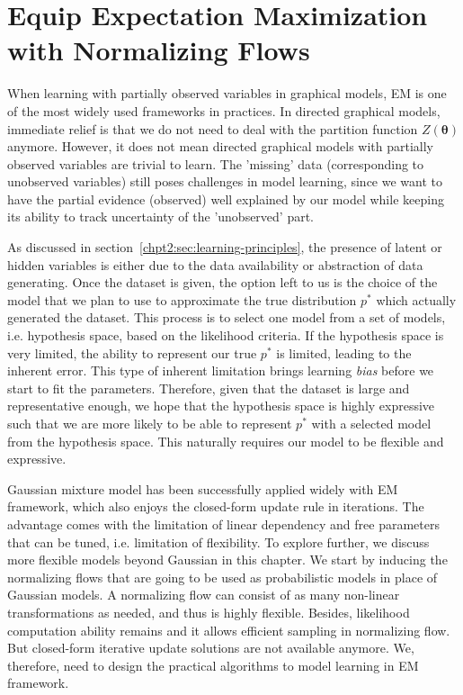 \chapter{Equip Expectation Maximization with Normalizing Flows}
\label{chpt6:em-flow}
\graphicspath{{source/chapter6/}}

When learning with partially observed variables in graphical models, EM is one of the most widely used frameworks in practices. In directed graphical models, immediate relief is that we do not need to deal with the partition function $Z(\bm{\theta})$ anymore. However, it does not mean directed graphical models with partially observed variables are trivial to learn. The 'missing' data (corresponding to unobserved variables) still poses challenges in model learning, since we want to have the partial evidence (observed) well explained by our model while keeping its ability to track uncertainty of the 'unobserved' part.

As discussed in section~\ref{chpt2:sec:learning-principles}, the presence of latent or hidden variables is either due to the data availability or abstraction of data generating. Once the dataset is given, the option left to us is the choice of the model that we plan to use to approximate the true distribution $p^{\ast}$ which actually generated the dataset. This process is to select one model from a set of models, i.e. hypothesis space, based on the likelihood criteria. If the hypothesis space is very limited, the ability to represent our true $p^{\ast}$ is limited, leading to the inherent error. This type of inherent limitation brings learning \textit{bias} before we start to fit the parameters.
Therefore, given that the dataset is large and representative enough, we hope that the hypothesis space is highly expressive such that we are more likely to be able to represent $p^{\ast}$ with a selected model from the hypothesis space. This naturally requires our model to be flexible and expressive.

Gaussian mixture model has been successfully applied widely with EM framework, which also enjoys the closed-form update rule in iterations. The advantage comes with the limitation of linear dependency and free parameters that can be tuned, i.e. limitation of flexibility. To explore further, we discuss more flexible models beyond Gaussian in this chapter. We start by inducing the normalizing flows that are going to be used as probabilistic models in place of Gaussian models. A normalizing flow can consist of as many non-linear transformations as needed, and thus is highly flexible. Besides, likelihood computation ability remains and it allows efficient sampling in normalizing flow. But closed-form iterative update solutions are not available anymore. We, therefore, need to design the practical algorithms to model learning in EM framework.


